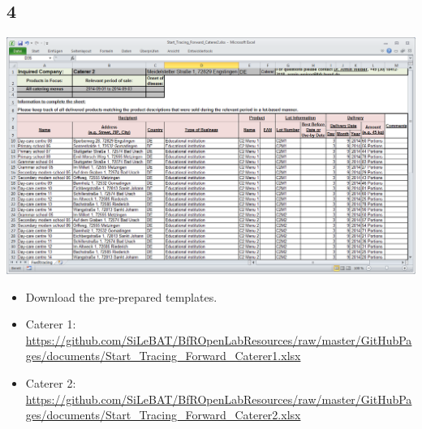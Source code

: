 \documentclass{beamer}
\begin{document}
\subsection{4}
\begin{frame}
	\begin{center}
  		\includegraphics[height=0.55\textheight]{4.png}
	\end{center}
	\begin{itemize}
		\item Download the pre-prepared templates.
		\item Caterer 1: \url{https://github.com/SiLeBAT/BfROpenLabResources/raw/master/GitHubPages/documents/Start_Tracing_Forward_Caterer1.xlsx}
		\item Caterer 2: \url{https://github.com/SiLeBAT/BfROpenLabResources/raw/master/GitHubPages/documents/Start_Tracing_Forward_Caterer2.xlsx}
	\end{itemize}
\end{frame}
\end{document}
